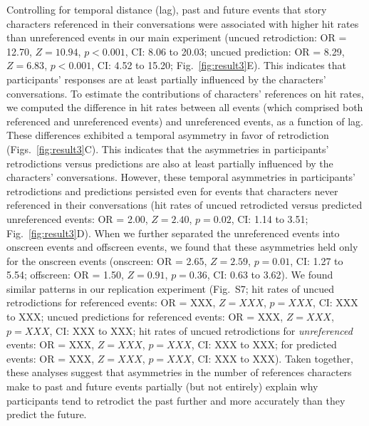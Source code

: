 \documentclass[10pt]{article}
\newcommand{\characterRefs}{S7}
\begin{document}
Controlling for temporal distance (lag), past and future events that story characters referenced in their conversations were associated with higher hit rates than unreferenced events in our main experiment (uncued retrodiction: OR = 12.70, $Z = 10.94$, $p < 0.001$, CI: 8.06 to 20.03; uncued prediction: OR = 8.29, $Z = 6.83$, $p < 0.001$, CI: 4.52 to 15.20; Fig.~\ref{fig:result3}E). This indicates that participants' responses are at least partially influenced by the characters' conversations. To estimate the contributions of characters’ references on hit rates, we computed the difference in hit rates between all events (which comprised both referenced and unreferenced events) and unreferenced events, as a function of lag. These differences exhibited a temporal asymmetry in favor of retrodiction (Figs.~\ref{fig:result3}C). This indicates that the asymmetries in participants' retrodictions versus predictions are also at least partially influenced by the characters' conversations. However, these temporal asymmetries in participants' retrodictions and predictions persisted even for events that characters never referenced in their conversations (hit rates of uncued retrodicted versus predicted unreferenced events: OR = 2.00, $Z = 2.40$, $p = 0.02$, CI: 1.14 to 3.51; Fig.~\ref{fig:result3}D). When we further separated the unreferenced events into onscreen events and offscreen events, we found that these asymmetries held only for the onscreen events (onscreen: OR = 2.65, $Z = 2.59$, $p = 0.01$, CI: 1.27 to 5.54; offscreen: OR = 1.50, $Z = 0.91$, $p = 0.36$, CI: 0.63 to 3.62). We found similar patterns in our replication experiment (Fig.~\characterRefs; hit rates of uncued retrodictions for referenced events: OR = XXX, $Z = XXX$, $p = XXX$, CI: XXX to XXX; uncued predictions for referenced events: OR = XXX, $Z = XXX$, $p = XXX$, CI: XXX to XXX; hit rates of uncued retrodictions for \textit{unreferenced} events: OR = XXX, $Z = XXX$, $p = XXX$, CI: XXX to XXX; for predicted events: OR = XXX, $Z = XXX$, $p = XXX$, CI: XXX to XXX). Taken together, these analyses suggest that asymmetries in the number of references characters make to past and future events partially (but not entirely) explain why participants tend to retrodict the past further and more accurately than they predict the future.
\end{document}
